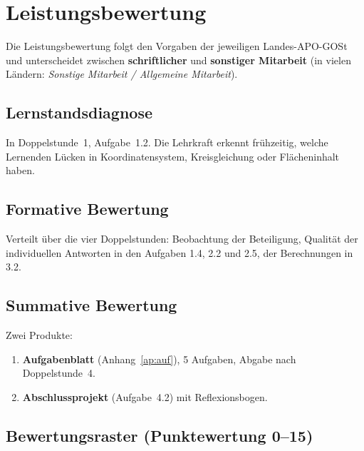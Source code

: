 \documentclass[12pt,a4paper]{scrartcl}
\newcommand{\acc}[1]{\textcolor{accent}{\textbf{#1}}}
\begin{document}
\section{Leistungsbewertung}

Die Leistungsbewertung folgt den Vorgaben der jeweiligen Landes-APO-GOSt und unterscheidet zwischen \acc{schriftlicher} und \acc{sonstiger Mitarbeit} (in vielen Ländern: \emph{Sonstige Mitarbeit / Allgemeine Mitarbeit}).

\subsection{Lernstandsdiagnose}
In Doppelstunde~1, Aufgabe~1.2. Die Lehrkraft erkennt frühzeitig, welche Lernenden Lücken in Koordinatensystem, Kreisgleichung oder Flächeninhalt haben.

\subsection{Formative Bewertung}
Verteilt über die vier Doppelstunden: Beobachtung der Beteiligung, Qualität der individuellen Antworten in den Aufgaben 1.4, 2.2 und 2.5, der Berechnungen in 3.2.

\subsection{Summative Bewertung}
Zwei Produkte:
\begin{enumerate}[leftmargin=1.5em,itemsep=0.2em,topsep=0.3em,nosep]
  \item \textbf{Aufgabenblatt} (Anhang~\ref{ap:auf}), 5 Aufgaben, Abgabe nach Doppelstunde~4.
  \item \textbf{Abschlussprojekt} (Aufgabe~4.2) mit Reflexionsbogen.
\end{enumerate}

\subsection{Bewertungsraster (Punktewertung 0--15)}
\end{document}
